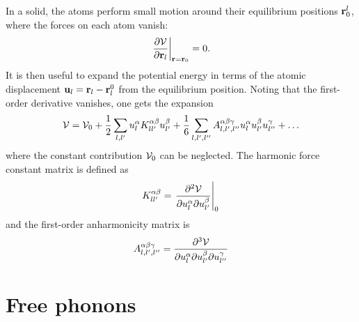 In a solid, the atoms perform small motion around their equilibrium positions $\mathbf{r}_0^l$, where the forces on each atom vanish:
\begin{equation}
  \left. \frac{\partial \mathcal{V}}{\partial \mathbf{r}_l} \right|_{\mathbf{r}=\mathbf{r}_0} = 0.
\end{equation}
It is then useful to expand the potential energy in terms of the atomic displacement $\mathbf{u}_l = \mathbf{r}_l-\mathbf{r}_l^0$ from the equilibrium position. Noting that the first-order derivative vanishes, one gets the expansion
\begin{equation}
 \ca{V} = \ca{V}_0 + \frac{1}{2} \sum_{l,l'} u_l^{\alpha} K_{ll'}^{\alpha\beta}  {u}_{l'}^{\beta} + \frac{1}{6} \sum_{l,l',l''} A^{\alpha \beta \gamma}_{l,l',l''} u^{\alpha}_l u^{\beta}_{l'} u^{\gamma}_{l''} + \dots \label{eq:V_expansion}
\end{equation}
where the constant contribution $\mathcal{V}_0$ can be neglected. The harmonic force constant matrix is defined as
\begin{equation}
K_{ll'}^{\alpha\beta} = \left. \frac{\partial^2 \mathcal{V}}{\partial  u_l^{\alpha}  \partial {u}_{l'}^{\beta}} \right|_0
\end{equation}
and the first-order anharmonicity matrix is 
\begin{equation}
A^{\alpha \beta \gamma}_{l,l',l''} = \frac{\partial^3 \mathcal{V}}{\partial u^{\alpha}_l \partial u^{\beta}_{l'} \partial u^{\gamma}_{l''}} 
\end{equation}

\section{Free phonons}

